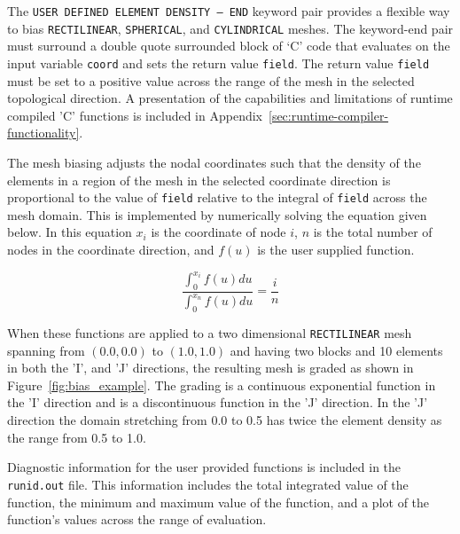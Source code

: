 The \texttt{USER DEFINED ELEMENT DENSITY -- END} keyword pair provides
a flexible way to bias \texttt{RECTILINEAR},
\texttt{SPHERICAL}, and \texttt{CYLINDRICAL} meshes. The keyword-end
pair must surround a double quote surrounded block of `C' code that
evaluates on the input variable \texttt{coord} and sets the return
value \texttt{field}. The return value \texttt{field} must be set to a
positive value across the range of the mesh in the selected
topological direction. A presentation of the capabilities and
limitations of runtime compiled 'C' functions is included in
Appendix~\ref{sec:runtime-compiler-functionality}.

The mesh biasing adjusts the nodal coordinates such that the density
of the elements in a region of the mesh in the selected coordinate
direction is proportional to the value of \texttt{field} relative to
the integral of \texttt{field} across the mesh domain. This is
implemented by numerically solving the equation given below. In this
equation \begin {math} x _ i \end {math} is the coordinate of node
\begin {math} i \end {math}, \begin {math} n \end {math} is the total
number of nodes in the coordinate direction, and \begin {math} f(u)
\end {math} is the user supplied function.

\begin{equation}
   \frac {\int _ {0} ^ {x _ i} f(u)du } {\int _ {0} ^ {x _ n} f(u)du }
   = \frac {i} {n}
\end{equation}

When these functions are applied to a two dimensional
\texttt{RECTILINEAR} mesh spanning from $(0.0, 0.0)$ to $(1.0, 1.0)$ and
having two blocks and 10 elements in both the 'I', and 'J' directions,
the resulting mesh is graded as shown in
Figure~\ref{fig:bias_example}.  The grading is a continuous
exponential function in the 'I' direction and is a discontinuous
function in the 'J' direction. In the 'J' direction the domain
stretching from 0.0 to 0.5 has twice the element density as the range
from 0.5 to 1.0.

Diagnostic information for the user provided functions is included in
the \texttt{runid.out} file.  This information includes the total
integrated value of the function, the minimum and maximum value of the
function, and a plot of the function's values across the range of
evaluation.


